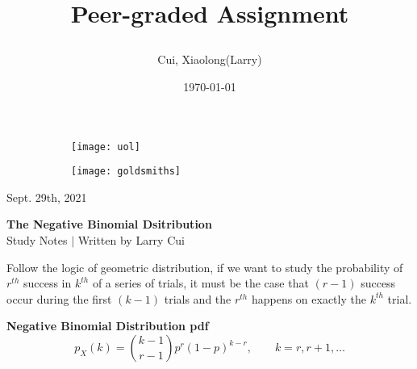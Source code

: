 \documentclass[11pt]{article}
\title{\vspace{-90pt} 



\textbf  {Peer-graded Assignment} }
\author{Cui, Xiaolong(Larry)}
\date{\today}
\begin{document}

\thispagestyle{plain}


\begin{figure}[H] %
  \begin{subfigure}{0.3\textwidth}
    \texttt{[image: uol]}
  \end{subfigure}
  \hfill
  \begin{subfigure}{0.3\textwidth}
    \texttt{[image: goldsmiths]}
  \end{subfigure}
\end{figure}


\begin{flushright}

\footnotesize {Sept. 29th,  2021}
\end{flushright}

\begin{center}
\textbf{The Negative Binomial Dsitribution} \\
\footnotesize {Study Notes $ | $ Written by Larry Cui}
\end{center}





\setcounter{figure}{0}

\vspace{10pt}


Follow the logic of geometric distribution,  if we want to study the probability of $r^{th}$ success in $k^{th}$ of a series of trials,  it must be the case that $(r-1)$ success occur during the first $(k-1)$ trials and the $r^{th}$ happens on exactly the $k^{th}$ trial. 


\begin{tcolorbox}[
	enhanced, 
	width=\textwidth, 
	fontupper=\normalsize,%
	drop fuzzy shadow southwest,
	boxrule=0.4pt,
	sharp corners,
	colframe=yellow!80!black,
	colback=yellow!10]
	
\textbf{\color{RoyalBlue} Negative Binomial Distribution pdf} 
\[ 
p_X (k) = \binom {k-1}{r-1} p^r (1-p)^{k-r} ,  \qquad k = r, r+1,  \dots
\]

\end{tcolorbox}
\end{document}
